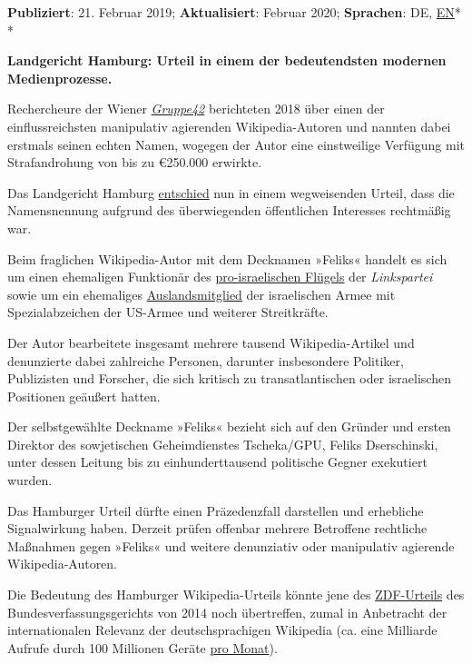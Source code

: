 \textbf{Publiziert}: 21. Februar 2019; \textbf{Aktualisiert}: Februar
2020; \textbf{Sprachen}: DE,
\href{https://swprs.org/ruling-wikipedia-trial/}{EN}*\\
*

\textbf{Landgericht Hamburg: Urteil in einem der bedeutendsten modernen
Medienprozesse.}

Rechercheure der Wiener \href{https://gruppe42.com/}{\emph{Gruppe42}}
berichteten 2018 über einen der einflussreichsten manipulativ agierenden
Wikipedia-Autoren und nannten dabei erstmals seinen echten Namen,
wogegen der Autor eine einstweilige Verfügung mit Strafandrohung von bis
zu €250.000 erwirkte.

Das Landgericht Hamburg
\href{https://kenfm.de/tagesdosis-26-2-2019-wikipedia-manipulationen-feliks-darf-nach-gerichtsurteil-wieder-mit-klarnamen-genannt-werden/}{entschied}
nun in einem wegweisenden Urteil, dass die Namensnennung aufgrund des
überwiegenden öffentlichen Interesses rechtmäßig war.

Beim fraglichen Wikipedia-Autor mit dem Decknamen »Feliks« handelt es
sich um einen ehemaligen Funktionär des
\href{https://de.wikipedia.org/wiki/Antideutsche}{pro-israelischen
Flügels} der \emph{Linkspartei} sowie um ein ehemaliges
\href{https://de.wikipedia.org/wiki/Sar-El}{Auslands­­mitglied} der
israelischen Armee mit Spezialabzeichen der US-Armee und weiterer
Streitkräfte.

Der Autor bearbeitete insgesamt mehrere tausend Wikipedia-Artikel und
denunzierte dabei zahlreiche Personen, darunter insbesondere Politiker,
Publizisten und Forscher, die sich kritisch zu transatlantischen oder
israelischen Positionen geäußert hatten.

Der selbstgewählte Deckname »Feliks« bezieht sich auf den Gründer und
ersten Direktor des sowjetischen Geheimdienstes Tscheka/GPU, Feliks
Dserschinski, unter dessen Leitung bis zu einhunderttausend politische
Gegner exekutiert wurden.

Das Hamburger Urteil dürfte einen Präzedenzfall darstellen und
erhebliche Signalwirkung haben. Derzeit prüfen offenbar mehrere
Betroffene rechtliche Maßnahmen gegen »Feliks« und weitere denunziativ
oder manipulativ agierende Wikipedia-Autoren.

Die Bedeutung des Hamburger Wikipedia-Urteils könnte jene des
\href{http://www.spiegel.de/kultur/tv/verfassungsgericht-klage-gegen-zdf-staatsvertrag-a-960571.html}{ZDF-Urteils}
des Bundes­­ver­fassungs­­gerichts von 2014 noch übertreffen, zumal in
Anbetracht der internationalen Relevanz der deutsch­sprachigen Wikipedia
(ca. eine Milliarde Aufrufe durch 100 Millionen Geräte
\href{https://swprs.org/propaganda-in-der-wikipedia/}{pro Monat}).

